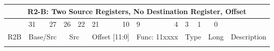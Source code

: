 \documentclass{article}
\begin{document}
\begin{center}
\begin{longtable}{|c|l|r|l|r|l|r|l|r|l|r|c|c|}
    
                    \multicolumn{13}{c}{R2-B: Two Source Registers, No Destination Register, Offset} \\ 
    \hline      &   \multicolumn{1}{l}{31}  &   27      &   \multicolumn{1}{l}{26}  &   22  &   \multicolumn{1}{l}{21}  &   10      &   \multicolumn{1}{l}{9}   &   4           &   \multicolumn{1}{l}{3}   &   1   &   0       & \\
    \hline R2B  &   \multicolumn{2}{|c|}{Base/Src}      &   \multicolumn{2}{|c|}{Src}       &   \multicolumn{2}{|c|}{Offset [11:0]} &   \multicolumn{2}{|c|}{Func: 11xxxx}      &   \multicolumn{2}{|c|}{Type}      &   Long    &   Description \\
    

    \hline              \multicolumn{13}{|c|}{} \\
    

\end{longtable}
\end{center}
\end{document}
